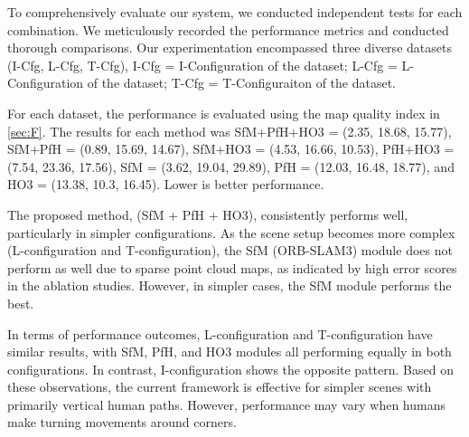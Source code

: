 \documentclass[letterpaper, 10 pt, conference]{ieeeconf}
\begin{document}
To comprehensively evaluate our system, we conducted independent tests for each combination. We meticulously recorded the performance metrics and conducted thorough comparisons. 
Our experimentation encompassed three diverse datasets
(I-Cfg, L-Cfg, T-Cfg),
I-Cfg = I-Configuration of the dataset; L-Cfg = L-Configuration of the dataset; T-Cfg = T-Configuraiton of the dataset. 

For each dataset,
the performance is  evaluated using the 
map quality index in \ref{sec:F}.
The results for each method was
SfM+PfH+HO3 = (2.35, 18.68, 15.77), 
SfM+PfH  = (0.89, 15.69, 14.67),
SfM+HO3 = (4.53, 16.66, 10.53),
PfH+HO3 =  (7.54, 23.36, 17.56), 
SfM  = (3.62, 19.04, 29.89), 
PfH = (12.03, 16.48, 18.77), 
and 
HO3 = (13.38, 10.3, 16.45).
Lower is better performance.


The proposed method, (SfM + PfH + HO3), consistently performs well, particularly in simpler configurations. As the scene setup becomes more complex (L-configuration and T-configuration), the SfM (ORB-SLAM3) module does not perform as well due to sparse point cloud maps, as indicated by high error scores in the ablation studies. However, in simpler cases, the SfM module performs the best.

In terms of performance outcomes, L-configuration and T-configuration have similar results, with SfM, PfH, and HO3 modules all performing equally in both configurations. In contrast, I-configuration shows the opposite pattern. Based on these observations, the current framework is effective for simpler scenes with primarily vertical human paths. However, performance may vary when humans make turning movements around corners.




\end{document}
